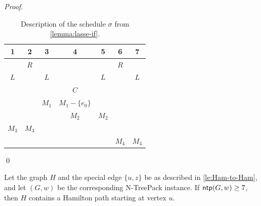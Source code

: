 \documentclass[runningheads]{llncs}
\newcommand{\set}[1]{\{ #1 \}}
\newcommand{\xxxNTP}{{\sc N-TreePack}}
\DeclareMathOperator{\ntp}{\text{\sf ntp}}
\begin{document}
\begin{proof}
\begin{table}[htpb]
\begin{tabular}{ c | c | c | c | c | c | c }
	1 & 2 & 3 & 4 & 5 & 6 & 7 \\
	\hline
	 & $R$ & & & & $R$ & \\
	 $L$ & & $L$ & & $L$ &  & $L$ \\
	 & & & $C$ & & &  \\
	 & & $M_1$ & $M_1 - \set{e_0}$  & & &  \\
	  & & & $M_2$  & $M_2$ & &  \\
	  $M_3$ & $M_3$ & &  &  & &  \\
	   & & &  &  & $M_4$ & $M_4$ 
 \end{tabular}
 \caption{Description of the schedule $\sigma$ from \cref{lemma:lasse-if}.}
 \label{table:lasse-if}
\end{table}
\qed
\end{proof}

\begin{lemma}
\label{lemma:lasse-only-if}
Let the graph $H$ and the special edge $\set{u,z}$ be as described in \cref{le:Ham-to-Ham}, and let $(G, w)$ be the corresponding {\xxxNTP} instance. If $\ntp(G, w) \geq 7$, then $H$ contains a Hamilton path starting at vertex $u$.
\end{lemma}
\end{document}
